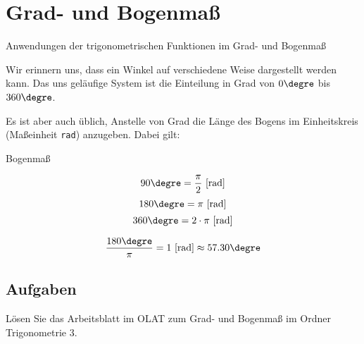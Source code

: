 
\section{Grad- und Bogenmaß}

Anwendungen der trigonometrischen Funktionen im Grad- und Bogenmaß

Wir erinnern uns, dass ein Winkel auf verschiedene Weise dargestellt
werden kann. Das uns geläufige System ist die Einteilung in Grad von
$0\degre$ bis $360\degre$.

Es ist aber auch üblich, Anstelle von Grad die Länge des Bogens im
Einheitskreis (Maßeinheit \texttt{rad}) anzugeben. Dabei gilt:

\begin{gesetz}{Bogenmaß}{}
  
  $$90\degre=\frac{\pi}2 \textrm{ [rad]}$$
  $$180\degre=\pi\textrm{ [rad]}$$
  $$360\degre=2\cdot{}\pi \textrm{ [rad]}$$

  $$\frac{180\degre}{\pi}  =1 \textrm{ [rad]} \approx{} 57.30\degre$$
  
\end{gesetz}

\subsection*{Aufgaben}
Lösen Sie das Arbeitsblatt im OLAT zum Grad- und Bogenmaß im Ordner Trigonometrie 3.

\newpage
